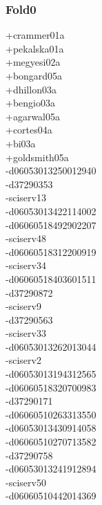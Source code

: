 \begin{multicols}{3}
\subsubsection*{Fold0}
+crammer01a\\
+pekalska01a\\
+megyesi02a\\
+bongard05a\\
+dhillon03a\\
+bengio03a\\
+agarwal05a\\
+cortes04a\\
+bi03a\\
+goldsmith05a\\
-d06053013250012940\\
-d37290353\\
-sciserv13\\
-d06053013422114002\\
-d06060518492902207\\
-sciserv48\\
-d06060518312200919\\
-sciserv34\\
-d06060518403601511\\
-d37290872\\
-sciserv9\\
-d37290563\\
-sciserv33\\
-d06053013262013044\\
-sciserv2\\
-d06053013194312565\\
-d06060518320700983\\
-d37290171\\
-d06060510263313550\\
-d06053013430914058\\
-d06060510270713582\\
-d37290758\\
-d06053013241912894\\
-sciserv50\\
-d06060510442014369\\

\end{multicols}
